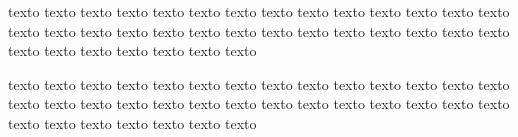 \documentclass{article}
\begin{document}
texto texto texto texto texto texto texto
texto texto texto texto texto texto texto
texto texto texto texto texto texto texto
texto texto texto texto texto texto texto
texto texto texto texto texto texto texto



texto texto texto texto texto texto texto
texto texto texto texto texto texto texto
texto texto texto texto texto texto texto
texto texto texto texto texto texto texto
texto texto texto texto texto texto texto
\end{document}

